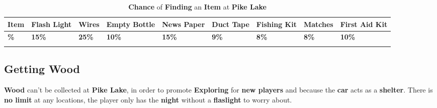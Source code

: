 			\begin{longtable}{|C{2.4em}|C{3.2em}|C{3.0em}|C{3.2em}|C{3.4em}|C{2.8em}|C{3.5em}|C{4.0em}|C{4.0em}|}
			    \toprule
			     \textcolor[rgb]{ 1,  1,  1}{\textbf{Item}} & \textbf{Flash Light} & \textbf{Wires} & \textbf{Empty Bottle} & \textbf{News Paper} & \textbf{Duct Tape} & \textbf{Fishing Kit} & \textbf{Matches} & \textbf{First Aid Kit} \\
			    \midrule
			     \textcolor[rgb]{ 1,  1,  1}{\textbf{\%}} & \textbf{15\%} & \textbf{25\%} & \textbf{10\%} & \textbf{15\%} & \textbf{9\%} & \textbf{8\%} & \textbf{8\%} & \textbf{10\%} \\
			     \bottomrule	
			\caption{\textbf{Chance} of \textbf{Finding} an \textbf{Item} at \textbf{Pike Lake}}
			\end{longtable}

		\subsection{Getting Wood}
		\par \textbf{Wood} can't be collected at \textbf{Pike Lake}, in order to promote \textbf{Exploring} for \textbf{new players} and because the \textbf{car} acts as a \textbf{shelter}. There is \textbf{no limit} at any locations, the player only has the \textbf{night} without a \textbf{flaslight} to worry about.

